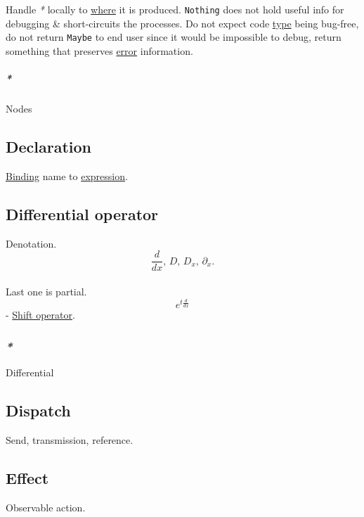 \documentclass[11pt]{article}
\begin{document}
Handle \emph{*} locally to \hyperref[orgefd1ecd]{where} it is produced. \texttt{Nothing} does not hold useful info for debugging \& short-circuits the processes. Do not expect code \hyperref[org4fbaeb8]{type} being bug-free, do not return \texttt{Maybe} to end user since it would be impossible to debug, return something that preserves \hyperref[orgb69b647]{error} information.\\

\subparagraph{\emph{*}}
\label{sec:org814d939}

\label{org58f2e0f}Nodes\\

\subsection{\label{org56ef1b9}Declaration}
\label{sec:org5c2d034}
\hyperref[org45a7ea1]{Binding} name to \hyperref[org667db83]{expression}.\\

\subsection{\label{orgd5c6a22}Differential operator}
\label{sec:org8f49816}
Denotation.\\
$$ \frac{d}{dx}, \, D, \, D_{x}, \, \partial_{x}. $$\\
Last one is partial.\\

$$ e^{t{\frac{d}{dx}}} $$ - \hyperref[org018408a]{Shift operator}.\\

\subsubsection{\emph{*}}
\label{sec:org733dff3}

\label{org9428cbd}Differential\\

\subsection{\label{orgddfd699}Dispatch}
\label{sec:orgd746ca3}
Send, transmission, reference.\\

\subsection{\label{org9502b33}Effect}
\label{sec:org0f9a9e9}
Observable action.\\
\end{document}
